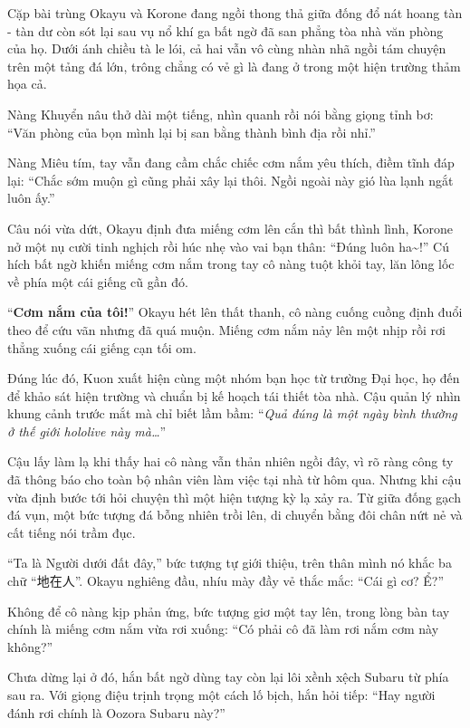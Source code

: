\documentclass[../main.tex]{subfiles}
\begin{document}
Cặp bài trùng Okayu và Korone đang ngồi thong thả giữa đống đổ nát hoang tàn - tàn dư còn sót lại sau vụ nổ khí ga bất ngờ đã san phẳng tòa nhà văn phòng của họ. Dưới ánh chiều tà le lói, cả hai vẫn vô cùng nhàn nhã ngồi tám chuyện trên một tảng đá lớn, trông chẳng có vẻ gì là đang ở trong một hiện trường thảm họa cả.


Nàng Khuyển nâu thở dài một tiếng, nhìn quanh rồi nói bằng giọng tỉnh bơ: ``Văn phòng của bọn mình lại bị san bằng thành bình địa rồi nhỉ.''

Nàng Miêu tím, tay vẫn đang cầm chắc chiếc cơm nắm yêu thích, điềm tĩnh đáp lại: ``Chắc sớm muộn gì cũng phải xây lại thôi. Ngồi ngoài này gió lùa lạnh ngắt luôn ấy.''

Câu nói vừa dứt, Okayu định đưa miếng cơm lên cắn thì bất thình lình, Korone nở một nụ cười tinh nghịch rồi húc nhẹ vào vai bạn thân: ``Đúng luôn ha\~{}!''
Cú hích bất ngờ khiến miếng cơm nắm trong tay cô nàng tuột khỏi tay, lăn lông lốc về phía một cái giếng cũ gần đó.

``\textbf{Cơm nắm của tôi!}'' Okayu hét lên thất thanh, cô nàng cuống cuồng định đuổi theo để cứu vãn nhưng đã quá muộn. Miếng cơm nắm nảy lên một nhịp rồi rơi thẳng xuống cái giếng cạn tối om.

Đúng lúc đó, Kuon xuất hiện cùng một nhóm bạn học từ trường Đại học, họ đến để khảo sát hiện trường và chuẩn bị kế hoạch tái thiết tòa nhà. Cậu quản lý nhìn khung cảnh trước mắt mà chỉ biết lầm bầm: ``\textit{Quả đúng là một ngày bình thường ở thế giới hololive này mà\dots}''

Cậu lấy làm lạ khi thấy hai cô nàng vẫn thản nhiên ngồi đây, vì rõ ràng công ty đã thông báo cho toàn bộ nhân viên làm việc tại nhà từ hôm qua. Nhưng khi cậu vừa định bước tới hỏi chuyện thì một hiện tượng kỳ lạ xảy ra. Từ giữa đống gạch đá vụn, một bức tượng đá bỗng nhiên trồi lên, di chuyển bằng đôi chân nứt nẻ và cất tiếng nói trầm đục.


``Ta là Người dưới đất đây,'' bức tượng tự giới thiệu, trên thân mình nó khắc ba chữ ``地在人''. Okayu nghiêng đầu, nhíu mày đầy vẻ thắc mắc: ``Cái gì cơ? Ể?''

Không để cô nàng kịp phản ứng, bức tượng giơ một tay lên, trong lòng bàn tay chính là miếng cơm nắm vừa rơi xuống: ``Có phải cô đã làm rơi nắm cơm này không?''

Chưa dừng lại ở đó, hắn bất ngờ dùng tay còn lại lôi xềnh xệch Subaru từ phía sau ra. Với giọng điệu trịnh trọng một cách lố bịch, hắn hỏi tiếp: ``Hay người đánh rơi chính là Oozora Subaru này?''
\end{document}
